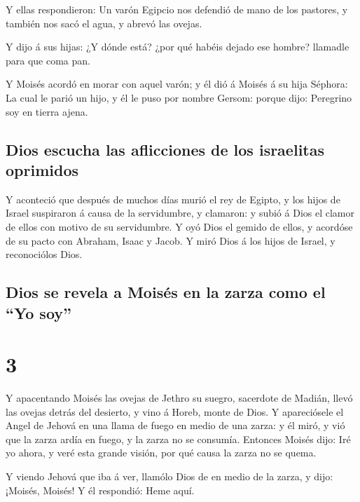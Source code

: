  Y ellas respondieron: Un varón Egipcio nos defendió de
mano de los pastores, y también nos sacó el agua, y abrevó las ovejas.

 Y dijo á sus hijas: ¿Y dónde está? ¿por qué habéis
dejado ese hombre? llamadle para que coma pan.

 Y Moisés acordó en morar con aquel varón; y él dió á
Moisés á su hija Séphora:  La cual le parió un hijo, y él
le puso por nombre Gersom: porque dijo: Peregrino soy en tierra ajena.

\hypertarget{dios-escucha-las-aflicciones-de-los-israelitas-oprimidos}{%
\subsection{Dios escucha las aflicciones de los israelitas
oprimidos}\label{dios-escucha-las-aflicciones-de-los-israelitas-oprimidos}}

 Y aconteció que después de muchos días murió el rey de
Egipto, y los hijos de Israel suspiraron á causa de la servidumbre, y
clamaron: y subió á Dios el clamor de ellos con motivo de su
servidumbre.  Y oyó Dios el gemido de ellos, y acordóse
de su pacto con Abraham, Isaac y Jacob.  Y miró Dios á
los hijos de Israel, y reconociólos Dios.

\hypertarget{dios-se-revela-a-moisuxe9s-en-la-zarza-como-el-yo-soy}{%
\subsection{Dios se revela a Moisés en la zarza como el ``Yo
soy''}\label{dios-se-revela-a-moisuxe9s-en-la-zarza-como-el-yo-soy}}

\hypertarget{section-02-3}{%
\section{3}\label{section-02-3}}

 Y apacentando Moisés las ovejas de Jethro su suegro,
sacerdote de Madián, llevó las ovejas detrás del desierto, y vino á
Horeb, monte de Dios.  Y apareciósele el Angel de Jehová
en una llama de fuego en medio de una zarza: y él miró, y vió que la
zarza ardía en fuego, y la zarza no se consumía.  Entonces
Moisés dijo: Iré yo ahora, y veré esta grande visión, por qué causa la
zarza no se quema.

 Y viendo Jehová que iba á ver, llamólo Dios de en medio
de la zarza, y dijo: ¡Moisés, Moisés! Y él respondió: Heme aquí.

